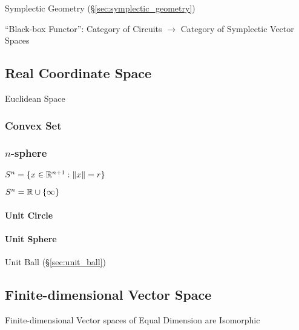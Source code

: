 Symplectic Geometry (\S\ref{sec:symplectic_geometry})

``Black-box Functor'': Category of Circuits $\rightarrow$ Category of
Symplectic Vector Spaces %



\subsection{Real Coordinate Space}\label{sec:real_space}

Euclidean Space %



\subsubsection{Convex Set}\label{sec:convex_set}

\subsubsection{$n$-sphere}\label{sec:n_sphere}

$S^n = \{ x \in \mathbb{R}^{n+1} : \|x\| = r \}$

$S^n = \mathbb{R} \cup \{\infty\}$



\paragraph{Unit Circle}\label{sec:unit_circle}\hfill

\paragraph{Unit Sphere}\label{sec:unit_sphere}\hfill

Unit Ball (\S\ref{sec:unit_ball})



\subsection{Finite-dimensional Vector Space}
\label{sec:finite_dimensional_vectorspace}

Finite-dimensional Vector spaces of Equal Dimension are Isomorphic



